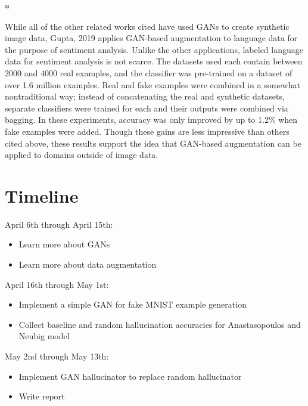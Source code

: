 ≈\documentclass{article}
\begin{document}
    While all of the other related works cited have used GANs to create synthetic image data, Gupta, 2019 \cite{gupta} applies GAN-based augmentation to language data for the purpose of sentiment analysis. Unlike the other applications, labeled language data for sentiment analysis is not scarce. The datasets used each contain between 2000 and 4000 real examples, and the classifier was pre-trained on a dataset of over 1.6 million examples. Real and fake examples were combined in a somewhat nontraditional way; instead of concatenating the real and synthetic datasets, separate classifiers were trained for each and their outputs were combined via bagging. In these experiments, accuracy was only improved by up to 1.2\% when fake examples were added. Though these gains are less impressive than others cited above, these results support the idea that GAN-based augmentation can be applied to domains outside of image data.

  \section{Timeline}
    April 6th through April 15th:
    \begin{itemize}
      \item{Learn more about GANs}
      \item{Learn more about data augmentation}
    \end{itemize}
    April 16th through May 1st:
    \begin{itemize}
      \item{Implement a simple GAN for fake MNIST example generation}
      \item{Collect baseline and random hallucination accuracies for Anastasopoulos and Neubig model}
    \end{itemize}
    May 2nd through May 13th:
    \begin{itemize}
      \item{Implement GAN hallucinator to replace random hallucinator}
      \item{Write report}
    \end{itemize}

  
\end{document}
